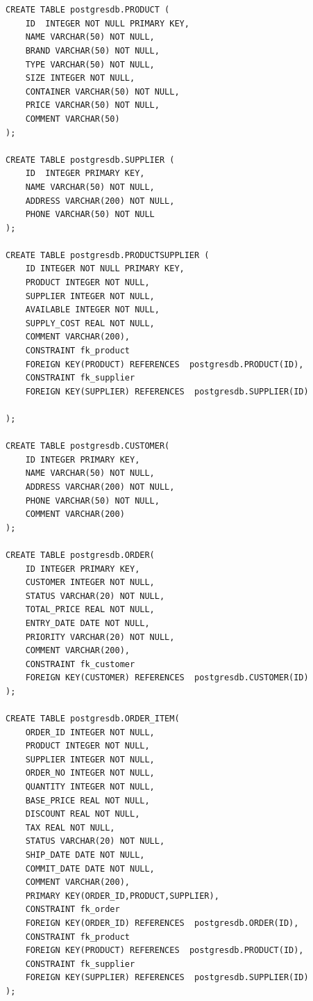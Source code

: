 \documentclass[12pt,oneside]{memoir}
\begin{document}

\begin{lstlisting}[title={setup-postgres-model.sql},captionpos=t]


CREATE TABLE postgresdb.PRODUCT (
    ID  INTEGER NOT NULL PRIMARY KEY,
    NAME VARCHAR(50) NOT NULL,
    BRAND VARCHAR(50) NOT NULL,
    TYPE VARCHAR(50) NOT NULL,
    SIZE INTEGER NOT NULL,
    CONTAINER VARCHAR(50) NOT NULL,
    PRICE VARCHAR(50) NOT NULL,
    COMMENT VARCHAR(50)
);

CREATE TABLE postgresdb.SUPPLIER (
    ID  INTEGER PRIMARY KEY,
    NAME VARCHAR(50) NOT NULL,
    ADDRESS VARCHAR(200) NOT NULL,
    PHONE VARCHAR(50) NOT NULL
);

CREATE TABLE postgresdb.PRODUCTSUPPLIER (
    ID INTEGER NOT NULL PRIMARY KEY,
    PRODUCT INTEGER NOT NULL,
    SUPPLIER INTEGER NOT NULL,
    AVAILABLE INTEGER NOT NULL,
    SUPPLY_COST REAL NOT NULL,
    COMMENT VARCHAR(200),
    CONSTRAINT fk_product
    FOREIGN KEY(PRODUCT) REFERENCES  postgresdb.PRODUCT(ID),
    CONSTRAINT fk_supplier
    FOREIGN KEY(SUPPLIER) REFERENCES  postgresdb.SUPPLIER(ID)
    
);

CREATE TABLE postgresdb.CUSTOMER(
    ID INTEGER PRIMARY KEY,
    NAME VARCHAR(50) NOT NULL,
    ADDRESS VARCHAR(200) NOT NULL,
    PHONE VARCHAR(50) NOT NULL,
    COMMENT VARCHAR(200)
);

CREATE TABLE postgresdb.ORDER(
    ID INTEGER PRIMARY KEY,
    CUSTOMER INTEGER NOT NULL,
    STATUS VARCHAR(20) NOT NULL,
    TOTAL_PRICE REAL NOT NULL,
    ENTRY_DATE DATE NOT NULL,
    PRIORITY VARCHAR(20) NOT NULL,
    COMMENT VARCHAR(200),
    CONSTRAINT fk_customer
    FOREIGN KEY(CUSTOMER) REFERENCES  postgresdb.CUSTOMER(ID)
);

CREATE TABLE postgresdb.ORDER_ITEM(
    ORDER_ID INTEGER NOT NULL,
    PRODUCT INTEGER NOT NULL,
    SUPPLIER INTEGER NOT NULL, 
    ORDER_NO INTEGER NOT NULL,
    QUANTITY INTEGER NOT NULL,
    BASE_PRICE REAL NOT NULL,
    DISCOUNT REAL NOT NULL,
    TAX REAL NOT NULL,
    STATUS VARCHAR(20) NOT NULL,
    SHIP_DATE DATE NOT NULL,
    COMMIT_DATE DATE NOT NULL,
    COMMENT VARCHAR(200),
    PRIMARY KEY(ORDER_ID,PRODUCT,SUPPLIER),
    CONSTRAINT fk_order
    FOREIGN KEY(ORDER_ID) REFERENCES  postgresdb.ORDER(ID),
    CONSTRAINT fk_product
    FOREIGN KEY(PRODUCT) REFERENCES  postgresdb.PRODUCT(ID),
    CONSTRAINT fk_supplier
    FOREIGN KEY(SUPPLIER) REFERENCES  postgresdb.SUPPLIER(ID)
);

\end{lstlisting}
\end{document}
